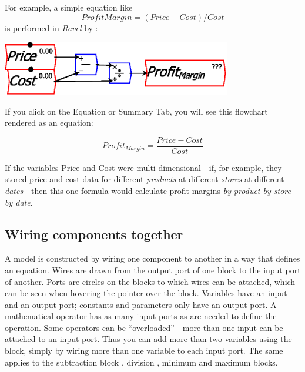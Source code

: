 For example, a simple equation like 
\[
ProfitMargin=(Price-Cost)/Cost
\]
is performed in \emph{Ravel} by :
\begin{center}
\includegraphics[width=10cm]{images/ProfitMarginEquation} 
\par\end{center}

If you click on the Equation or Summary Tab, you will see this flowchart
rendered as an equation:

\[
Profit_{Margin}=\frac{Price-Cost}{Cost}
\]

If the variables Price and Cost were multi-dimensional---if, for
example, they stored price and cost data for different \emph{products}
at different \emph{stores} at different \emph{dates}---then this
one formula would calculate profit margins \emph{by product by store
by date}.

\subsection{Wiring components together}

A model is constructed by wiring one component to another in a way
that defines an equation. Wires are drawn from the output port of
one block to the input port of another. Ports are circles on the blocks
to which wires can be attached, which can be seen when hovering the
pointer over the block. Variables have an input and an output port;
constants and parameters only have an output port. A mathematical
operator has as many input ports as are needed to define the operation.
Some operators can be ``overloaded''---more than one input can
be attached to an input port. Thus you can add more than two variables
using the block, simply by wiring more
than one variable to each input port. The same applies to the subtraction
block , division ,
minimum  and maximum 
blocks.
